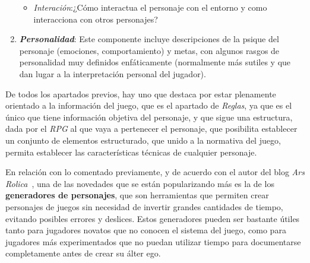\begin{enumerate}
\begin{itemize}
        \item \textit{Interación}:¿Cómo interactua el personaje con el entorno y como interacciona con otros personajes?
    
    \end{itemize}
    
    \item \textbf{\textit{Personalidad}}: Este componente incluye descripciones de la psique del personaje (emociones, 
    comportamiento) y metas, con algunos rasgos de personalidad muy definidos enfáticamente (normalmente más sutiles y 
    que dan lugar a la interpretación personal del jugador).

\end{enumerate}

De todos los apartados previos, hay uno que destaca por estar plenamente orientado a la información del juego, que es el apartado 
de \textit{Reglas}, ya que es el único que tiene información objetiva del personaje, y que sigue una estructura, dada por el 
\textit{RPG} al que vaya a pertenecer el personaje, que posibilita establecer un conjunto de elementos estructurado, que unido a la
normativa del juego, permita establecer las características técnicas de cualquier personaje. \medskip

En relación con lo comentado previamente, y de acuerdo con el autor del blog \textit{Ars Rolica}~\autocite*{ArsRolica}, 
una de las novedades que se están popularizando más es la de los \textbf{generadores de personajes}, que son herramientas que permiten 
crear personajes de juegos sin necesidad de invertir grandes cantidades de tiempo, evitando posibles errores y deslices. 
Estos generadores pueden ser bastante útiles tanto para jugadores novatos que no conocen el sistema del juego, como para 
jugadores más experimentados que no puedan utilizar tiempo para documentarse completamente antes de crear su álter ego. \medskip

